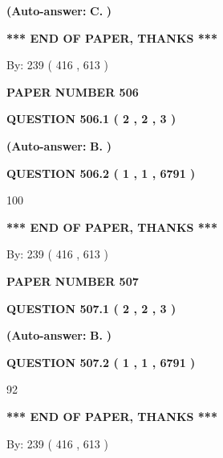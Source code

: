 \documentclass[12pt]{article}
\begin{document}
 
{\textbf{(Auto-answer:}}
{\textbf{\large{
C.}}}
{\textbf{)}}
 
 
   
   
   
   
\vspace{1.0in} 
{\textbf{\large{ *** END OF PAPER, THANKS *** }}} 
   
   
\hspace{1.0in} By: 
 239 ( 416 ,  613 )
   
   
   
   
\newpage 
\setcounter{page}{ 
   506001 } 
   
   
 {\textbf{ \Large{ PAPER NUMBER  506  }}}
   
   
   
   
  
  
{\textbf{\large{QUESTION
506.1 
 ( 2 , 2 , 3 )
}}}
 
 
{\textbf{(Auto-answer:}}
{\textbf{\large{
B.}}}
{\textbf{)}}
 
 
  
  
{\textbf{\large{QUESTION
506.2 
 ( 1 , 1 , 6791 )
}}}

100
   
   
   
   
\vspace{1.0in} 
{\textbf{\large{ *** END OF PAPER, THANKS *** }}} 
   
   
\hspace{1.0in} By: 
 239 ( 416 ,  613 )
   
   
   
   
\newpage 
\setcounter{page}{ 
   507001 } 
   
   
 {\textbf{ \Large{ PAPER NUMBER  507  }}}
   
   
   
   
  
  
{\textbf{\large{QUESTION
507.1 
 ( 2 , 2 , 3 )
}}}
 
 
{\textbf{(Auto-answer:}}
{\textbf{\large{
B.}}}
{\textbf{)}}
 
 
  
  
{\textbf{\large{QUESTION
507.2 
 ( 1 , 1 , 6791 )
}}}

92
   
   
   
   
\vspace{1.0in} 
{\textbf{\large{ *** END OF PAPER, THANKS *** }}} 
   
   
\hspace{1.0in} By: 
 239 ( 416 ,  613 )
   
   
   
\end{document}
